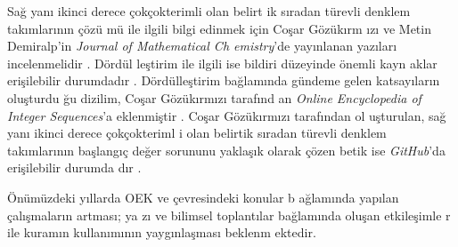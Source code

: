 \documentclass[a4paper,10pt]{article}
\begin{document}
Sa\u{g} yan{\i} ikinci derece \c{c}ok\c{c}okterimli olan belir\-t%
ik s\i radan t\"urevli denklem tak\i mlar{\i}n\i n \c{c}\"o\-z\"u%
m\"u ile ilgili bilgi edinmek i\c{c}in Co\c{s}ar G\"o\-z\"uk\i rm%
{\i}z{\i} ve Metin Demiralp'in \textit{Journal of Mathematical Ch%
emistry}'de yay\i nlanan yaz\i lar{\i} incelenmelidir %
\cite{p1,p2}. D\"ord\"ul%
le\c{s}\-ti\-rim ile ilgili ise bildiri d\"uzeyinde \"onemli kayn%
aklar eri\c{s}ilebilir durum\-da\-d\i r \cite{MD2014Dec,cg2015, 
mek2015}. %
D\"ord\"ulle\c{s}tirim %
ba\u{g}lam\i nda g\"undeme gelen katsay\i lar\i n o\-lu\c{s}turdu%
\u{g}u dizilim, Co\c{s}ar G\"oz\"uk\i rm\i z{\i} ta\-ra\-f\i n\-d%
an \textit{Online Encyclopedia of Integer Sequences}'a 
ek\-len\-mi\c{s}tir \cite{encent, enc}. %
Co\c{s}ar G\"oz\"uk\i rm\i z{\i} ta\-raf\i n\-dan o\-l%
u\c{s}turulan, sa\u{g} yan{\i} ikinci derece \c{c}ok\c{c}okteriml%
i olan belirtik s\i ra\-dan t\"urevli denklem tak\i mlar\i n\i n %
ba\c{s}lang\i \c{c} de\-\u{g}er so\-rununu yakla\c{s}\i k olarak %
\c{c}\"ozen betik ise \textit{GitHub}'da eri\c{s}ilebilir durumda%
d\i r \cite{code}. %

\"On\"um\"uzdeki y\i llarda OEK ve \c{c}ev\-re\-sindeki konular b%
a\u{g}lam\i nda yap\i lan \c{c}al\i \c{s}malar\i n artmas{\i}; ya%
z{\i} ve bilimsel toplant\i lar ba\u{g}lam\i nda olu\c{s}an 
etkile\c{s}imle%
r ile kuram\i n kullan\i m\i n\i n yayg\i nla\c{s}mas{\i} beklenm%
ektedir. %

  


\end{document}
